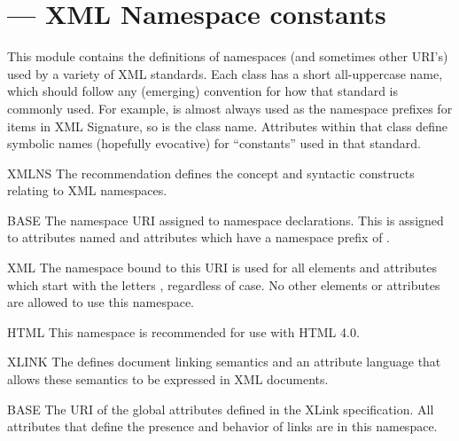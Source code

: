 \documentclass{howto}
\begin{document}
\section{ ---
         XML Namespace constants}


This module contains the definitions of namespaces (and sometimes
other URI's) used by a variety of XML standards.  Each class has a
short all-uppercase name, which should follow any (emerging)
convention for how that standard is commonly used.  For example,
 is almost always used as the namespace prefixes for items in
XML Signature, so  is the class name.  Attributes within that
class define symbolic names (hopefully evocative) for ``constants''
used in that standard.

\begin{classdesc*}{XMLNS}
  The  recommendation defines the concept and syntactic constructs
  relating to XML namespaces.

  \begin{memberdesc}{BASE}
    The namespace URI assigned to namespace declarations.  This is
    assigned to attributes named  and attributes which
    have a namespace prefix of .
  \end{memberdesc}

  \begin{memberdesc}{XML}
    The namespace bound to this URI is used for all elements and
    attributes which start with the letters , regardless of
    case.  No other elements or attributes are allowed to use this
    namespace.
  \end{memberdesc}

  \begin{memberdesc}{HTML}
    This namespace is recommended for use with HTML 4.0.
  \end{memberdesc}
\end{classdesc*}


\begin{classdesc*}{XLINK}
  The 
  defines document linking semantics and an attribute language that
  allows these semantics to be expressed in XML documents.

  \begin{memberdesc}{BASE}
    The URI of the global attributes defined in the XLink
    specification.  All attributes that define the presence and
    behavior of links are in this namespace.
  \end{memberdesc}
\end{classdesc*}
\end{document}
